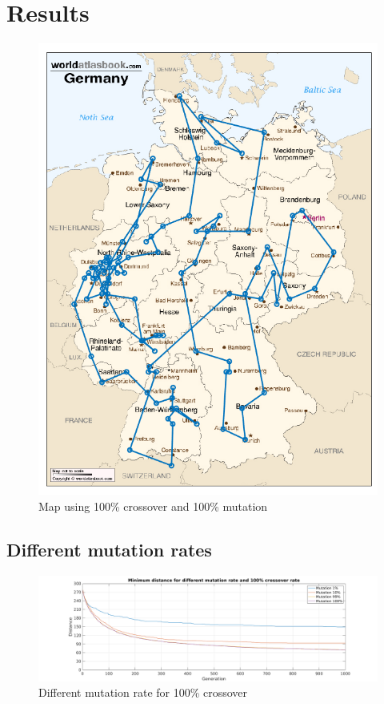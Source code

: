 \documentclass[a4paper, 12pt]{article}
\begin{document}
\section{Results}

\begin{figure}[ht!]
  \centering
  \includegraphics[width=1.0\textwidth]{images/resultmap-mine-crop}
    \caption{Map using 100\% crossover and 100\% mutation \label{fig:map}}
\end{figure}

\subsection{Different mutation rates}

\begin{figure}[ht!]
	\centering
	\includegraphics[width=1.1\textwidth]{images/mutfig-mine}
	\caption{Different mutation rate for 100\% crossover \label{fig:mutfig}}
\end{figure}
\end{document}
